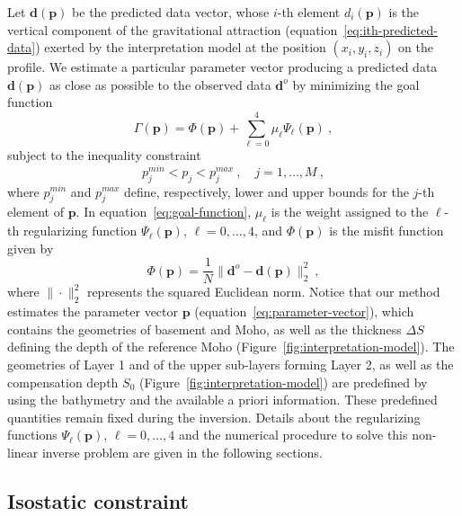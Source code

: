 \documentclass[manuscript]{geophysics}
\begin{document}
Let $\mathbf{d}(\mathbf{p})$ be the predicted data vector, whose $i$-th element
$d_{i}(\mathbf{p})$ is the vertical component of the gravitational attraction
(equation~\ref{eq:ith-predicted-data}) exerted by the interpretation model
at the position $(x_{i}, y_{i}, z_{i})$ on the profile.
We estimate a particular parameter vector producing a predicted data
$\mathbf{d}(\mathbf{p})$ as close as possible to the observed data 
$\mathbf{d}^{o}$ by minimizing the goal function
\begin{equation}
\Gamma (\mathbf{p}) = \Phi(\mathbf{p}) + \sum_{\ell = 0}^{4} \mu_{\ell}
\Psi_{\ell}(\mathbf{p}) \: ,
\label{eq:goal-function}
\end{equation}
subject to the inequality constraint 
\begin{equation}
p_{j}^{min} < p_{j} < p_{j}^{max} \: , \quad j = 1, \dots, M \: ,
\label{eq:inequality-constraint}
\end{equation}
where $p_{j}^{min}$ and $p_{j}^{max}$ define, respectively, lower and upper bounds 
for the $j$-th element of $\mathbf{p}$.
In equation~\ref{eq:goal-function}, $\mu_{\ell}$ is the weight assigned to the 
$\ell$-th regularizing function $\Psi_{\ell}(\mathbf{p})$, $\ell = 0, \dots, 4$, and
$\Phi(\mathbf{p})$ is the misfit function given by
\begin{equation}
\Phi(\mathbf{p}) = \frac{1}{N} \| \mathbf{d}^{o} - \mathbf{d}(\mathbf{p}) \|_{2}^{2} 
\: , 
\label{eq:misfit-function}
\end{equation}
where $\| \cdot \|_{2}^{2}$ represents the squared Euclidean norm. 
Notice that our method estimates the parameter vector $\mathbf{p}$ 
(equation~\ref{eq:parameter-vector}), which contains the geometries of 
basement and Moho, as well as the thickness $\Delta S$ defining
the depth of the reference Moho (Figure~\ref{fig:interpretation-model}).
The geometries of Layer 1 and of the upper sub-layers forming Layer 2, as well as the 
compensation depth $S_{0}$ (Figure~\ref{fig:interpretation-model}) are predefined by 
using the bathymetry and the available a priori information. 
These predefined quantities remain fixed during the inversion.
Details about the regularizing functions $\Psi_{\ell}(\mathbf{p})$, $\ell = 0, \dots, 4$ 
and the numerical procedure to solve this non-linear inverse problem are given in the 
following sections.


\subsection{Isostatic constraint}
\end{document}
